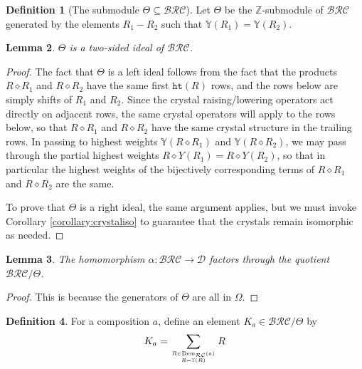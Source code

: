 \documentclass{amsart}
\newtheorem{lemma}{Lemma}[subsection]
\theoremstyle{definition}
\newtheorem{definition}[lemma]{Definition}
\theoremstyle{remark}
\numberwithin{equation}{subsection}
\newcommand{\hr}{\mathtt{ht}}
\newcommand{\BRC}{\mathcal{BRC}}
\newcommand{\RC}{\mathcal{RC}}
\newcommand{\dcoma}{\mathcal{D}}
\begin{document}
\begin{definition}[The submodule $\Theta\subseteq \BRC$]
  Let $\Theta$ be the $\mathbb{Z}$-submodule of $\BRC$ generated by the elements $R_1-R_2$ such that $\mathbb{Y}(R_1)=\mathbb{Y}(R_2)$.

\end{definition}

\begin{lemma}
  $\Theta$ is a two-sided ideal of $\BRC$.
\end{lemma}
\begin{proof}
  The fact that $\Theta$ is a left ideal follows from the fact that the products $R\diamond R_1$ and $R\diamond R_2$ have the same first $\hr(R)$ rows, and the rows below are simply shifts of $R_1$ and $R_2$. Since the crystal raising/lowering operators act directly on adjacent rows, the same crystal operators will apply to the rows below, so that $R\diamond R_1$ and $R\diamond R_2$ have the same crystal structure in the trailing rows. In passing to highest weights $\mathbb{Y}(R\diamond R_1)$ and $\mathbb{Y}(R\diamond R_2)$, we may pass through the partial highest weights $R\diamond Y(R_1) = R\diamond Y(R_2)$, so that in particular the highest weights of the bijectively corresponding terms of $R\diamond R_1$ and $R\diamond R_2$ are the same.
  

  To prove that $\Theta$ is a right ideal, the same argument applies, but we must invoke Corollary \ref{corollary:crystaliso} to guarantee that the crystals remain isomorphic as needed.
\end{proof}

\begin{lemma}
  The homomorphism $\alpha:\BRC\to\dcoma$ factors through the quotient $\BRC/\Theta$.
\end{lemma}
\begin{proof}
This is because the generators of $\Theta$ are all in $\Omega$.
\end{proof}

\begin{definition}
For a composition $a$, define  an element $K_a\in\BRC/\Theta$ by
$$K_a =\sum_{R\in\mathrm{Dem}_{\RC}(a)\atop R=\mathbb{Y}(R)} R$$
\end{definition}
\end{document}
